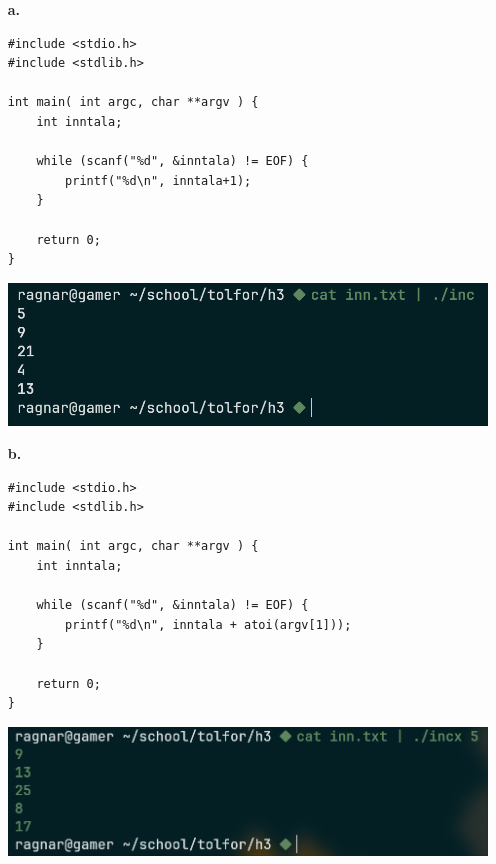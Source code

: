 \documentclass{article}
\begin{document}
\begin{itemize}
	\item[\textbf{a.}]
\begin{verbatim}
#include <stdio.h>
#include <stdlib.h>

int main( int argc, char **argv ) {
	int inntala;

	while (scanf("%d", &inntala) != EOF) {
		printf("%d\n", inntala+1);
	}

	return 0;
}
\end{verbatim}
	\includegraphics[scale=0.3]{inc.png}
	\newpage
\item[\textbf{b.}]
\begin{verbatim}
#include <stdio.h>
#include <stdlib.h>

int main( int argc, char **argv ) {
	int inntala;

	while (scanf("%d", &inntala) != EOF) {
		printf("%d\n", inntala + atoi(argv[1]));
	}

	return 0;
}
\end{verbatim}
	\includegraphics[scale=0.3]{incx.png}
\end{itemize}
\end{document}
